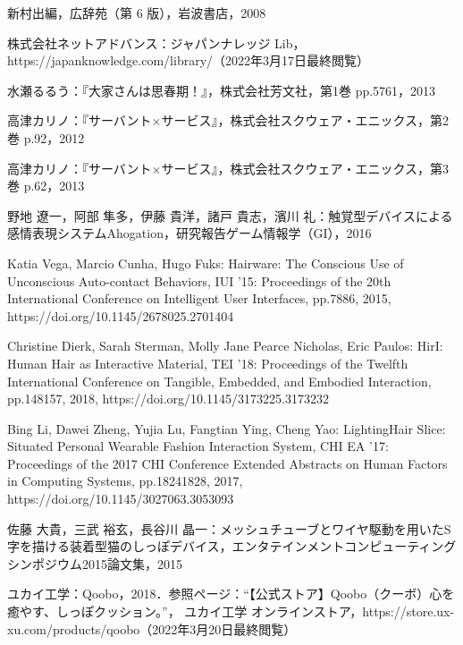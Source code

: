\documentclass[a4paper]{jsarticle}
\begin{document}
\begin{thebibliography}{999}
新村出編，広辞苑（第 6 版），岩波書店，2008

\begin{flushleft}
株式会社ネットアドバンス：ジャパンナレッジ Lib，https://japanknowledge.com/library/（2022年3月17日最終閲覧）
\end{flushleft}

水瀬るるう：『大家さんは思春期！』，株式会社芳文社，第1巻 pp.5761，2013

高津カリノ：『サーバント×サービス』，株式会社スクウェア・エニックス，第2巻 p.92，2012

高津カリノ：『サーバント×サービス』，株式会社スクウェア・エニックス，第3巻 p.62，2013

野地 遼一，阿部 隼多，伊藤 貴洋，諸戸 貴志，濱川 礼：触覚型デバイスによる感情表現システムAhogation，研究報告ゲーム情報学（GI），2016

\begin{flushleft}
Katia Vega, Marcio Cunha, Hugo Fuks: Hairware: The Conscious Use of Unconscious Auto-contact Behaviors, IUI '15: Proceedings of the 20th International Conference on Intelligent User Interfaces, pp.7886, 2015, https://doi.org/10.1145/2678025.2701404
\end{flushleft}

Christine Dierk, Sarah Sterman, Molly Jane Pearce Nicholas, Eric Paulos: HirI: Human Hair as Interactive Material, TEI '18: Proceedings of the Twelfth International Conference on Tangible, Embedded, and Embodied Interaction, pp.148157, 2018, https://doi.org/10.1145/3173225.3173232

Bing Li, Dawei Zheng, Yujia Lu, Fangtian Ying, Cheng Yao: LightingHair Slice: Situated Personal Wearable Fashion Interaction System, CHI EA '17: Proceedings of the 2017 CHI Conference Extended Abstracts on Human Factors in Computing Systems, pp.18241828, 2017, https://doi.org/10.1145/3027063.3053093

佐藤 大貴，三武 裕玄，長谷川 晶一：メッシュチューブとワイヤ駆動を用いたS字を描ける装着型猫のしっぽデバイス，エンタテインメントコンピューティングシンポジウム2015論文集，2015

ユカイ工学：Qoobo，2018．参照ページ：“【公式ストア】Qoobo（クーボ）心を癒やす、しっぽクッション。”， ユカイ工学 オンラインストア，https://store.ux-xu.com/products/qoobo（2022年3月20日最終閲覧）


\end{thebibliography}
\end{document}
